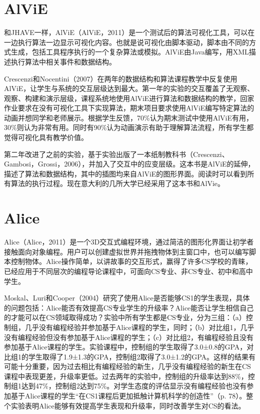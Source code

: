 \section{AlViE}
\begin{sectext}
和JHAVE一样，AlViE（AlViE，2011）是一个测试后的算法可视化工具，可以在一边执行算法一边显示可视化内容。也就是说可视化由脚本驱动，脚本由不同的方式生成，包括工具程序执行的一个复杂算法或模拟。AlViE由Java编写，用XML描述执行算法中相关事件和数据结构。

Crescenzi和Nocentini（2007）在两年的数据结构和算法课程教学中反复使用AlViE，让学生与系统的交互层级达到最大。第一年的实验的交互覆盖了无观察、观察、构建和演示层级，课程系统地使用AlViE进行算法和数据结构的教学，回家作业要求在没有可视化工具下实现算法，期末项目要求使用AlViE编写特定算法的动画并想同学和老师展示。根据学生反馈，70\%认为期末测试中使用AlViE有用，30\%则认为非常有用。同时有90\%认为动画演示有助于理解算法流程，所有学生都觉得可视化具有教学价值。

第二年改进了之前的实验，基于实验出版了一本纸制教科书（Crescenzi、Gambosi，Grossi，2006），并加入了交互中的应变层级。这本书是AlViE的延伸，描述了算法和数据结构，其中的插图均来自AlViE的图形界面。阅读时可以看到所有算法的执行过程。现在意大利的几所大学已经采用了这本书和AlVie。
\end{sectext}
\section{Alice}
\begin{sectext}
Alice（Alice，2011）是一个3D交互式编程环境，通过简洁的图形化界面让初学者接触面向对象编程。用户可以创建虚拟世界并拖拽物体到主窗口中，也可以编写脚本控制物体。Alice操作简单，以讲故事的交互形式，赢得了许多CS学校的青睐，已经应用于不同层次的编程导论课程中，可面向CS专业、非CS专业、初中和高中学生。

Moskal、Luri和Cooper（2004）研究了使用Alice是否能够CS1的学生表现，具体的问题包括：Alice能否有效提高CS专业学生的升级率？Alice能否让学生相信自己的才能可以在CS领域取得成功？实验中所有学生都是CS专业，分为三组：（a）控制组，几乎没有编程经验并参加基于Alice课程的学生，同时；（b）对比组1，几乎没有编程经验但没有参加基于Alice课程的学生；（c）对比组2，有编程经验且没有参加基于Alice课程的学生。实验课程中，控制组的学生取得了3.0±0.8的GPA，对比组1的学生取得了1.9±1.3的GPA，控制组2取得了3.0±1.2的GPA。这样的结果有可能十分重要，因为过去相比有编程经验的新生，几乎没有编程经验的新生在CS课程中表现更差，升级率更低。过去两年的实验中，控制组的升级率达到88\%，控制组1达到47\%，控制组2达到75\%。对学生态度的评估显示没有编程经验也没有参加基于Alice课程的学生``在CS1课程后更加抵触计算机科学的创造性''（p. 78）。整个实验表明Alice能够有效提高学生表现和升级率，同时改善学生对CS的看法。
\end{sectext}
